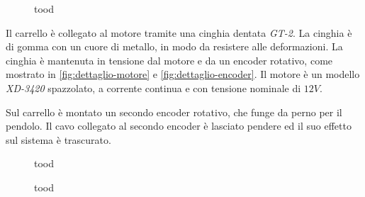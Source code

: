 \begin{figure}
    \centering
    \caption[todo]{tood}
    \label{fig:dettaglio-carrello}
\end{figure}

Il carrello è collegato al motore tramite una cinghia dentata \emph{GT-2}.
La cinghia è di gomma con un cuore di metallo, in modo da resistere
alle deformazioni. La cinghia è mantenuta in tensione dal motore e da un
encoder rotativo, come mostrato in \autoref{fig:dettaglio-motore} e 
\autoref{fig:dettaglio-encoder}. Il motore è un modello \emph{XD-3420}
spazzolato, a corrente continua e con tensione nominale di $12V$.

Sul carrello è montato un secondo encoder rotativo,
che funge da perno per il pendolo. Il cavo collegato al secondo encoder è lasciato pendere ed il suo effetto sul sistema è trascurato.

\begin{figure}[h]
    \centering
    \caption[todo]{tood}
    \label{fig:dettaglio-motore}
\end{figure}
\begin{figure}[h]
    \centering
    \caption[todo]{tood}
    \label{fig:dettaglio-encoder}
\end{figure}


